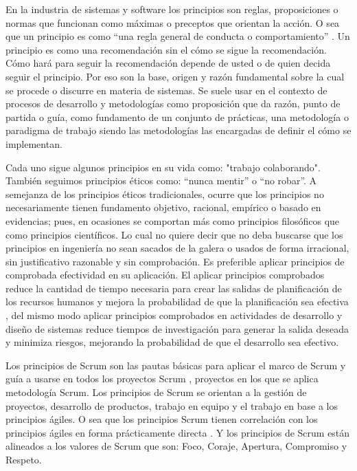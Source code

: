 En la industria de sistemas y software los principios son reglas, proposiciones o normas que funcionan como máximas o preceptos que orientan la acción. O sea que un principio es como “una regla general de conducta o comportamiento” \cite{Lawson-Martin-2008} \cite{SEBoK-2014}. Un principio es como una recomendación sin el cómo se sigue la recomendación. Cómo hará para seguir la recomendación depende de usted o de quien decida seguir el principio. Por eso son la base, origen y razón fundamental sobre la cual se procede o discurre en materia de sistemas. Se suele usar en el contexto de procesos de desarrollo y metodologías como proposición que da razón, punto de partida o guía, como fundamento de un conjunto de prácticas, una metodología o paradigma de trabajo siendo las metodologías las encargadas de definir el cómo se implementan.

Cada uno sigue algunos principios en su vida como: "trabajo colaborando". También seguimos principios éticos como: “nunca mentir” o “no robar”. A semejanza de los principios éticos tradicionales, ocurre que los principios no necesariamente tienen fundamento objetivo, racional, empírico o basado en evidencias; pues, en ocasiones se comportan más como principios filosóficos que como principios científicos. Lo cual no quiere decir que no deba buscarse que los principios en ingeniería no sean sacados de la galera o usados de forma irracional, sin justificativo razonable y sin comprobación. Es preferible aplicar principios de comprobada efectividad en su aplicación. El aplicar principios comprobados reduce la cantidad de tiempo necesaria para crear las salidas de planificación de los recursos humanos y mejora la probabilidad de que la planificación sea efectiva \cite{PMBOK-2004}, del mismo modo aplicar principios comprobados en actividades de desarrollo y diseño de sistemas reduce tiempos de investigación para generar la salida deseada y minimiza riesgos, mejorando la probabilidad de que el desarrollo sea efectivo. 

Los principios de Scrum son las pautas básicas para aplicar el marco de Scrum y guía a usarse en todos los proyectos Scrum \cite{SBOK-2013}, proyectos en los que se aplica metodología Scrum. Los principios de Scrum se orientan a la gestión de proyectos, desarrollo de productos, trabajo en equipo y el trabajo en base a los principios ágiles. O sea que los principios Scrum tienen correlación con los principios ágiles en forma prácticamente directa \cite{Agile-Atlas-2012}. Y los principios de Scrum están alineados a los valores de Scrum que son: Foco, Coraje, Apertura, Compromiso y Respeto.


